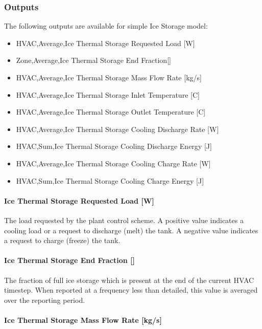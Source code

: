 \subsubsection{Outputs}\label{outputs-18-000}

The following outputs are available for simple Ice Storage model:

\begin{itemize}
\item
  HVAC,Average,Ice Thermal Storage Requested Load {[}W{]}
\item
  Zone,Average,Ice Thermal Storage End Fraction{[]}
\item
  HVAC,Average,Ice Thermal Storage Mass Flow Rate {[}kg/s{]}
\item
  HVAC,Average,Ice Thermal Storage Inlet Temperature {[}C{]}
\item
  HVAC,Average,Ice Thermal Storage Outlet Temperature {[}C{]}
\item
  HVAC,Average,Ice Thermal Storage Cooling Discharge Rate {[}W{]}
\item
  HVAC,Sum,Ice Thermal Storage Cooling Discharge Energy {[}J{]}
\item
  HVAC,Average,Ice Thermal Storage Cooling Charge Rate {[}W{]}
\item
  HVAC,Sum,Ice Thermal Storage Cooling Charge Energy {[}J{]}
\end{itemize}

\paragraph{Ice Thermal Storage Requested Load {[}W{]}}\label{ice-thermal-storage-requested-load-w}

The load requested by the plant control scheme. A positive value indicates a cooling load or a request to discharge (melt) the tank. A negative value indicates a request to charge (freeze) the tank.

\paragraph{Ice Thermal Storage End Fraction {[]}}\label{ice-thermal-storage-end-fraction}

The fraction of full ice storage which is present at the end of the current HVAC timestep. When reported at a frequency less than detailed, this value is averaged over the reporting period.

\paragraph{Ice Thermal Storage Mass Flow Rate {[}kg/s{]}}\label{ice-thermal-storage-mass-flow-rate-kgs}

